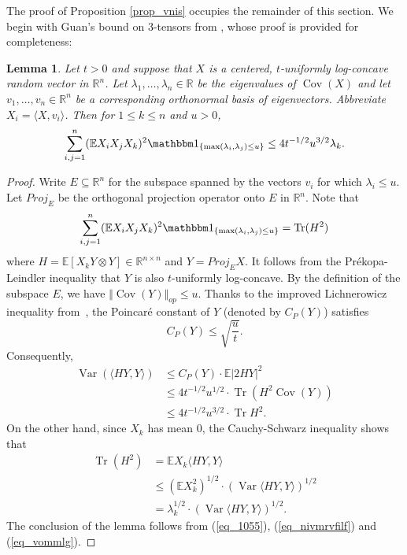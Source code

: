 \documentclass[12pt,a4paper]{article}
\newcommand{\Tr}{\mathop{\mathrm{Tr}}\nolimits}
\newcommand{\E}{\mathbb{E}}
\newcommand{\RR}{\mathbb{R}}
\newcommand{\R}{\mathbb{R}}
\newcommand{\cov}{\mathop{\mathrm{Cov}}\nolimits}
\newcommand{\var}{\mathop{\mathrm{Var}}\nolimits}
\newtheorem{lemma}[theorem]{Lemma}
\theoremstyle{definition}
\begin{document}
\medskip The proof of Proposition \ref{prop_vnis} occupies the remainder of this section. 
We begin with Guan's bound on $3$-tensors from \cite{guan}, whose proof is provided for completeness:
%
\begin{lemma}\label{lem_guan} Let $t > 0$ and suppose that $X$ is a centered, $t$-uniformly log-concave random vector in $\R^n$. 
Let $\lambda_1,\ldots,\lambda_n \in \RR$ be the eigenvalues of $\cov(X)$
and let $v_1,\ldots,v_n \in \RR^n$ be a corresponding orthonormal basis of eigenvectors. 
Abbreviate $X_i = \langle X, v_i \rangle$. Then for  $1 \leq k \leq n$ and $u>0$,
$$ \sum_{i,j=1}^{n}  ( \E X_i X_j X_k )^2 \mathbbm 1_{\{ \max(\lambda_i,\lambda_j) \leq u \}}  \leq 4 t^{-1/2} u^{3/2} \lambda_k. $$
\end{lemma}
%
%
\begin{proof} Write $E \subseteq \RR^n$ for the subspace spanned by the vectors
$v_i$ for which $\lambda_i \leq u$. Let $Proj_E$ be the orthogonal projection operator onto $E$ in $\RR^n$.
Note that
\begin{equation} 
\sum_{i,j=1}^{n}  ( \E X_i X_j X_k )^2  \mathbbm 1_{\{ \max(\lambda_i,\lambda_j) \leq u \}}
= \Tr ( H^2 )
\label{eq_1055} \end{equation}
where $H = \E \left[ X_k Y \otimes Y \right] \in \RR^{n \times n}$ and $Y = Proj_E X$.
It follows from the Pr\'ekopa-Leindler inequality that
$Y$ is also $t$-uniformly log-concave.
By the definition of the subspace $E$, we have $\Vert \cov(Y) \Vert_{op} \leq u$.
Thanks to the improved Lichnerowicz inequality from~\cite{K_root}, the Poincar\'e constant of $Y$ (denoted by $C_P (Y)$) satisfies
\[
C_P ( Y ) \leq  \sqrt{ \frac u t }.
\]
Consequently, 
\begin{equation}\label{eq_nivmrvfilf}
\begin{split}
\var ( \langle H Y, Y\rangle )
& \leq C_P(Y) \cdot  \E \vert 2 H Y \vert^2  \\
& \leq 4 t^{-1/2} u^{1/2} \cdot \Tr ( H^2 \cov (Y) ) \\
& \leq 4 t^{-1/2} u^{3/2} \cdot \Tr H^2 .
\end{split}
\end{equation}
On the other hand, since $X_k$ has mean $0$, the Cauchy-Schwarz
inequality shows that
\begin{equation} \label{eq_vommlg}
\begin{split}
\Tr ( H^2 ) & = \E X_k \langle H Y , Y \rangle  \\
& \leq ( \E X_k^2 )^{1/2} \cdot ( \var \langle H Y , Y \rangle )^{1/2} \\
& = \lambda_k^{1/2} \cdot ( \var \langle H Y , Y \rangle )^{1/2} .
\end{split}
\end{equation}
The conclusion of the lemma follows from (\ref{eq_1055}), (\ref{eq_nivmrvfilf}) and (\ref{eq_vommlg}).
\end{proof}
\end{document}
